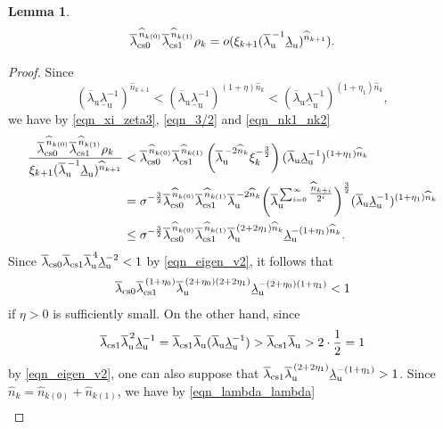\documentclass{amsart}
\theoremstyle{plain}
\newtheorem{lem}[thm]{Lemma}
\theoremstyle{definition}
\numberwithin{equation}{section}
\numberwithin{figure}{section}
\def\wh{\widehat}
\def\ul{\underline}
\def\ol{\overline}
\def\ru{{\mathrm{u}}}
\begin{document}
\begin{lem}\label{lem7.3}
$$
\ol\lambda_{\rm cs0}^{\,\widehat n_{k(0)}}\ol\lambda_{\rm cs1}^{\,\widehat n_{k(1)}}\rho_{k}=o(\xi_{k+1}(\ol\lambda_{\ru}^{\,-1}\ul\lambda_{\ru})^{\wh n_{k+1}}).
$$
\end{lem}
\begin{proof}
Since 
\[
(\ol\lambda_{\ru}\ul\lambda_{\ru}^{-1})^{\wh n_{k+1}}
<(\ol\lambda_{\ru}\ul\lambda_{\ru}^{-1})^{(1+\eta)\wh n_{k}}
<(\ol\lambda_{\ru}\ul\lambda_{\ru}^{-1})^{(1+\eta_1)\wh n_{k}},
\]
we have 
by \eqref{eqn_xi_zeta3}, \eqref{eqn_3/2} and \eqref{eqn_nk1_nk2} 
\begin{align}\label{eqn_lambda_lambda}
\frac{ \ol\lambda_{\rm cs0}^{\,\widehat n_{k(0)}}\ol\lambda_{\rm cs1}^{\,\widehat n_{k(1)}}\rho_{k}}{\xi_{k+1}(\ol\lambda_{\ru}^{\,-1}\ul\lambda_{\ru})^{\wh n_{k+1}}}
&<\ol\lambda_{\rm cs0}^{\,\widehat n_{k(0)}}\ol\lambda_{\rm cs1}^{\,\widehat n_{k(1)}} \left(\ol{\lambda}_{\rm u}^{\,-2\wh n_k}\xi_k^{-\frac32}\right)(\ol\lambda_{\ru}\ul\lambda_{\ru}^{-1})^{(1+\eta_1)\wh n_k}\nonumber\\
&=
\sigma^{-\frac{3}{2}} \ol\lambda_{\rm cs0}^{\,\widehat n_{k(0)}}\ol\lambda_{\rm cs1}^{\,\widehat n_{k(1)}} \ol{\lambda}_{\rm u}^{\,-2 \widehat n_{k}}
\biggl(\ol{\lambda}_{\rm u}^
{\,\sum_{i=0}^{\infty}\tfrac{\widehat n_{k+i}}{2^{i}}}
\biggr)^{\frac{3}{2}}(\ol\lambda_{\ru}\ul\lambda_{\ru}^{-1})^{(1+\eta_1)\wh n_k}\nonumber\\
&\leq \sigma^{-\frac{3}{2}} \ol\lambda_{\rm cs0}^{\,\widehat n_{k(0)}}\ol\lambda_{\rm cs1}^{\,\widehat n_{k(1)}} \ol{\lambda}_{\rm u}^{\,(2+2\eta_1)\widehat n_{k}}\ul\lambda_{\ru}^{-(1+\eta_1)\wh n_k}.
\end{align}
Since 
$\ol\lambda_{\rm cs0}\ol\lambda_{\rm cs1}\ol\lambda_{\ru}^{\,4}\ul\lambda_{\ru}^{-2}<1$ 
by \eqref{eqn_eigen_v2}, it follows that  
\[
\ol\lambda_{\rm cs0}\ol\lambda_{\rm cs1}^{\,(1+\eta_0)}\ol\lambda_{\mathrm{u}}^{\,(2+\eta_0)(2+2\eta_{1})}\ul\lambda_{\ru}^{-(2+\eta_0)(1+\eta_1)}<1
\]
if $\eta>0$ is sufficiently small.
On the other hand, since 
\[
\ol\lambda_{\rm cs1}\ol\lambda_{\mathrm{u}}^{\,2}\ul\lambda_{\ru}^{-1}
=\ol\lambda_{\rm cs1}\ol\lambda_{\mathrm{u}}(\ol\lambda_{\mathrm{u}}\ul\lambda_{\ru}^{-1})>\ol\lambda_{\rm cs1}\ol\lambda_{\mathrm{u}}>2\cdot\frac12=1
\]
by \eqref{eqn_eigen_v2}, 
one can also suppose that 
$
\ol\lambda_{\rm cs1}\ol\lambda_{\mathrm{u}}^{\,(2+2\eta_{1})}\ul\lambda_{\ru}^{-(1+\eta_1)}>1$.
Since $\wh n_k=\wh n_{k(0)}+\wh n_{k(1)}$, we have by \eqref{eqn_lambda_lambda} 
\begin{align*}

\end{align*}
\end{proof}
\end{document}
